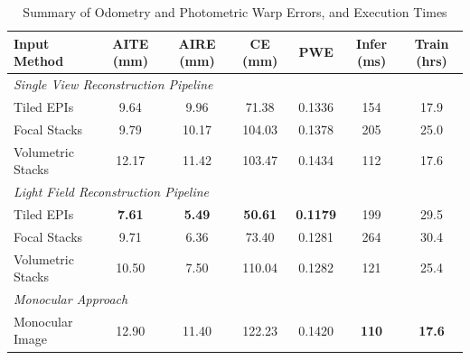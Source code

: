 \begin{table}[htbp]
    \caption{Summary of Odometry and Photometric Warp Errors, and Execution Times}
    \centering
    \hspace*{-0.4cm}
    \begin{tabular}{@{}lcccccc@{}}
        \toprule
        Input Method       & AITE (mm) & AIRE (mm) & CE (mm)   & PWE  & Infer (ms) & Train (hrs) \\
        \midrule 
        \multicolumn{3}{l}{\textit{Single View Reconstruction Pipeline}}\\
        Tiled EPIs & 9.64 & 9.96 & 71.38 & 0.1336 & 154 & 17.9 \\
        Focal Stacks & 9.79 & 10.17 & 104.03  & 0.1378 & 205 & 25.0 \\
        Volumetric Stacks & 12.17 & 11.42 & 103.47 & 0.1434 & 112 & 17.6\\
        \midrule 
        \multicolumn{3}{l}{\textit{Light Field Reconstruction Pipeline}}\\
        Tiled EPIs & \textbf{7.61} & \textbf{5.49} & \textbf{50.61} & \textbf{0.1179} & 199 & 29.5 \\
        Focal Stacks & 9.71 & 6.36 & 73.40 & 0.1281 & 264 & 30.4 \\
        Volumetric Stacks & 10.50 & 7.50 & 110.04 & 0.1282 & 121 & 25.4 \\
        \midrule 
        \multicolumn{3}{l}{\textit{Monocular Approach}}\\
        Monocular Image & 12.90 & 11.40 & 122.23 & 0.1420 & \textbf{110} & \textbf{17.6} \\
        \bottomrule
        
    \end{tabular}
\end{table}




























